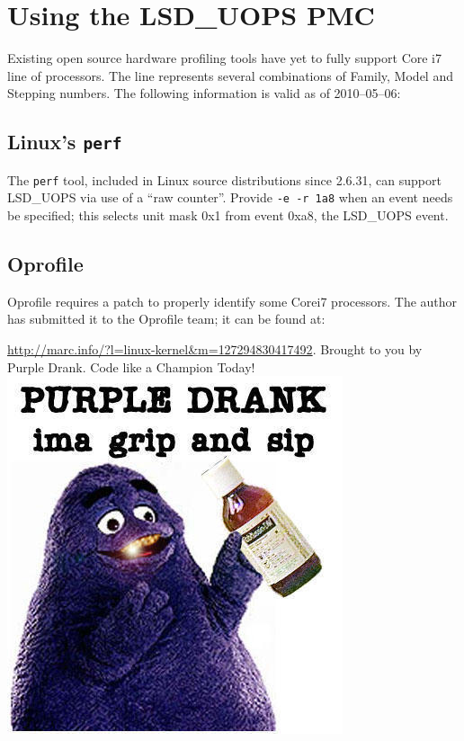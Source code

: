 \documentclass[]{sigplanconf}
\begin{document}
\appendix
\section{Using the LSD\_UOPS PMC}

Existing open source hardware profiling tools have yet to fully support Core\texttrademark
i7 line of processors. The line represents several combinations of Family,
Model and Stepping numbers\cite{intelcpuid}. The following information is valid
as of 2010--05--06:
\subsection{Linux's \texttt{perf}}
The \texttt{perf} tool, included in Linux source distributions since 2.6.31,
can support LSD\_UOPS via use of a ``raw counter''. Provide \texttt{-e -r 1a8}
when an event needs be specified; this selects unit mask 0x1 from event 0xa8,
the LSD\_UOPS event\cite{intelsys}.
\subsection{Oprofile}
Oprofile requires a patch to properly identify some Core\texttrademark i7
processors. The author has submitted it to the Oprofile team; it can be found
at:

\url{http://marc.info/?l=linux-kernel&m=127294830417492}.
\acks
Brought to you by Purple Drank\texttrademark. Code like a Champion Today!
\includegraphics[width=\columnwidth]{texobjs/drank.jpg}




\end{document}
